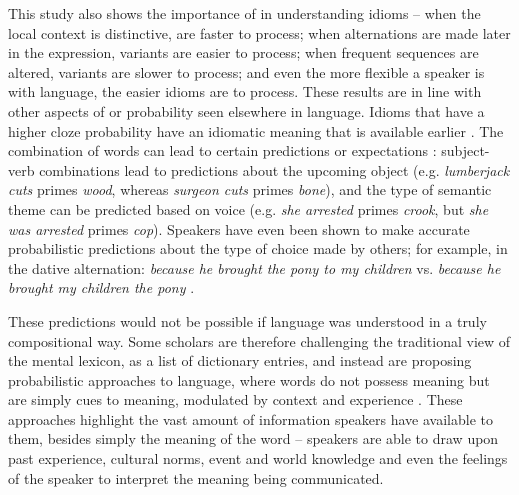 \documentclass[output=paper
,modfonts
,nonflat]{langsci/langscibook}
\begin{document}
This study also shows the importance of  in understanding idioms -- when the local context is distinctive,  are faster to process; when alternations are made later in the expression, variants are easier to process; when frequent sequences are altered, variants are slower to process; and even the more flexible a speaker is with language, the easier idioms are to process. These results are in line with other aspects of  or probability seen elsewhere in language. Idioms that have a higher cloze probability have an idiomatic meaning that is available earlier \citep{CacciariTabossi1988, TitoneConnine1994b}. The combination of words can lead to certain predictions or expectations \citep{Elman2011}: subject-verb combinations lead to predictions about the upcoming object (e.g. \textit{lumberjack cuts} primes \textit{wood}, whereas \textit{surgeon cuts} primes \textit{bone}), and the type of semantic theme can be predicted based on voice (e.g. \textit{she arrested} primes \textit{crook}, but \textit{she was arrested} primes \textit{cop}). Speakers have even been shown to make accurate probabilistic predictions about the type of  choice made by others; for example, in the dative alternation: \textit{because he brought the pony to my children} vs. \textit{because he brought my children the pony} \citep{Bresnan2007}.

These predictions would not be possible if language was understood in a truly compositional  way. Some scholars are therefore challenging the traditional view of the mental lexicon, as a list of dictionary entries, and instead are proposing probabilistic approaches to language, where words do not possess meaning but are simply cues to meaning, modulated by context and experience \citep{Elman2004, Elman2011, RamscarBaayen2013, RamscarBaayen2013}. These approaches highlight the vast amount of information speakers have available to them, besides simply the meaning of the word -- speakers are able to draw upon past experience, cultural norms, event and world knowledge and even the feelings of the speaker to interpret the meaning being communicated. 
\end{document}
